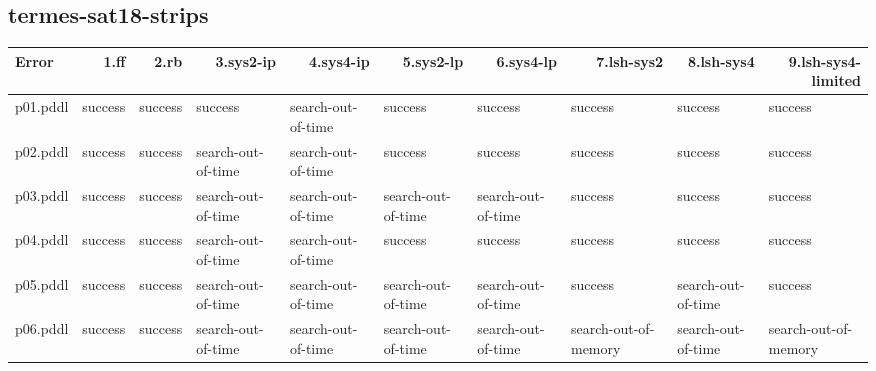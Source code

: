 \documentclass{article}
\begin{document}
\hypertarget{error-termes-sat18-strips}{}
\subsection*{termes-sat18-strips}

\begin{tabular}{@{}lrrrrrrrrr@{}}
Error & 1.ff & 2.rb & 3.sys2-ip & 4.sys4-ip & 5.sys2-lp & 6.sys4-lp & 7.lsh-sys2 & 8.lsh-sys4 & 9.lsh-sys4-limited \\
\midrule
p01.pddl & \multicolumn{1}{|l|}{success} & \multicolumn{1}{|l|}{success} & \multicolumn{1}{|l|}{success} & \multicolumn{1}{|l|}{search-out-of-time} & \multicolumn{1}{|l|}{success} & \multicolumn{1}{|l|}{success} & \multicolumn{1}{|l|}{success} & \multicolumn{1}{|l|}{success} & \multicolumn{1}{|l|}{success} \\
p02.pddl & \multicolumn{1}{|l|}{success} & \multicolumn{1}{|l|}{success} & \multicolumn{1}{|l|}{search-out-of-time} & \multicolumn{1}{|l|}{search-out-of-time} & \multicolumn{1}{|l|}{success} & \multicolumn{1}{|l|}{success} & \multicolumn{1}{|l|}{success} & \multicolumn{1}{|l|}{success} & \multicolumn{1}{|l|}{success} \\
p03.pddl & \multicolumn{1}{|l|}{success} & \multicolumn{1}{|l|}{success} & \multicolumn{1}{|l|}{search-out-of-time} & \multicolumn{1}{|l|}{search-out-of-time} & \multicolumn{1}{|l|}{search-out-of-time} & \multicolumn{1}{|l|}{search-out-of-time} & \multicolumn{1}{|l|}{success} & \multicolumn{1}{|l|}{success} & \multicolumn{1}{|l|}{success} \\
p04.pddl & \multicolumn{1}{|l|}{success} & \multicolumn{1}{|l|}{success} & \multicolumn{1}{|l|}{search-out-of-time} & \multicolumn{1}{|l|}{search-out-of-time} & \multicolumn{1}{|l|}{success} & \multicolumn{1}{|l|}{success} & \multicolumn{1}{|l|}{success} & \multicolumn{1}{|l|}{success} & \multicolumn{1}{|l|}{success} \\
p05.pddl & \multicolumn{1}{|l|}{success} & \multicolumn{1}{|l|}{success} & \multicolumn{1}{|l|}{search-out-of-time} & \multicolumn{1}{|l|}{search-out-of-time} & \multicolumn{1}{|l|}{search-out-of-time} & \multicolumn{1}{|l|}{search-out-of-time} & \multicolumn{1}{|l|}{success} & \multicolumn{1}{|l|}{search-out-of-time} & \multicolumn{1}{|l|}{success} \\
p06.pddl & \multicolumn{1}{|l|}{success} & \multicolumn{1}{|l|}{success} & \multicolumn{1}{|l|}{search-out-of-time} & \multicolumn{1}{|l|}{search-out-of-time} & \multicolumn{1}{|l|}{search-out-of-time} & \multicolumn{1}{|l|}{search-out-of-time} & \multicolumn{1}{|l|}{search-out-of-memory} & \multicolumn{1}{|l|}{search-out-of-time} & \multicolumn{1}{|l|}{search-out-of-memory} \\

\end{tabular}
\end{document}
